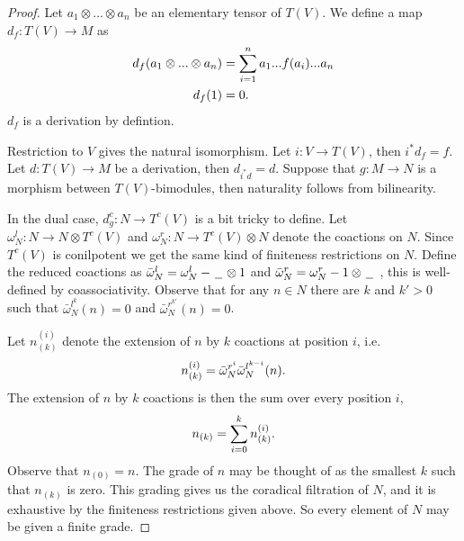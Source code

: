 \documentclass[../thesis.tex]{subfiles}
\begin{document}
            \begin{proof}
                Let $a_1\otimes ... \otimes a_n$ be an elementary tensor of $T(V)$. We define a map $d_f : T(V) \rightarrow M$ as
                \begin{align*}
                    d_f(a_1\otimes ... \otimes a_n) & = \sum_{i=1}^n a_1...f(a_i)...a_n \\
                    d_f(1) & = 0\tt{.} 
                \end{align*}
                $d_f$ is a derivation by defintion.
                
                Restriction to $V$ gives the natural isomorphism. Let $i : V\rightarrow T(V)$, then $i^*d_f = f$. Let $d : T(V) \rightarrow M$ be a derivation, then $d_{i^*d}=d$. Suppose that $g: M \rightarrow N$ is a morphism between $T(V)$-bimodules, then naturality follows from bilinearity.

                In the dual case, $d_g^c : N \rightarrow T^c(V)$ is a bit tricky to define. Let $\omega^l_N:N\rightarrow N\otimes T^c(V)$ and $\omega^r_N : N\rightarrow T^c(V) \otimes N$ denote the coactions on $N$. Since $T^c(V)$ is conilpotent we get the same kind of finiteness restrictions on $N$. Define the reduced coactions as $\bar{\omega}^l_N = \omega^l_N - \argument\otimes 1$ and $\bar{\omega}^r_N = \omega^r_N - 1\otimes\argument\ $, this is well-defined by coassociativity. Observe that for any $n\in N$ there are $k$ and $k'>0$ such that ${\bar{\omega}^{l^k}_N}(n) = 0$ and ${\bar{\omega}^{r^{k'}}_N}(n)=0$.

                Let $n_{(k)}^{(i)}$ denote the extension of $n$ by $k$ coactions at position $i$, i.e. 
                \begin{align*}
                    n_{(k)}^{(i)} = \bar{\omega}^{r^i}_N\bar{\omega}^{l^{k-i}}_N(n)\tt{.} 
                \end{align*}
                The extension of $n$ by $k$ coactions is then the sum over every position $i$,
                \begin{align*}
                    n_{(k)} = \sum_{i=0}^kn_{(k)}^{(i)}\tt{.}
                \end{align*} 
                Observe that $n_{(0)} = n$. The grade of $n$ may be thought of as the smallest $k$ such that $n_{(k)}$ is zero. This grading gives us the coradical filtration of $N$, and it is exhaustive by the finiteness restrictions given above. So every element of $N$ may be given a finite grade.


\end{proof}
\end{document}
